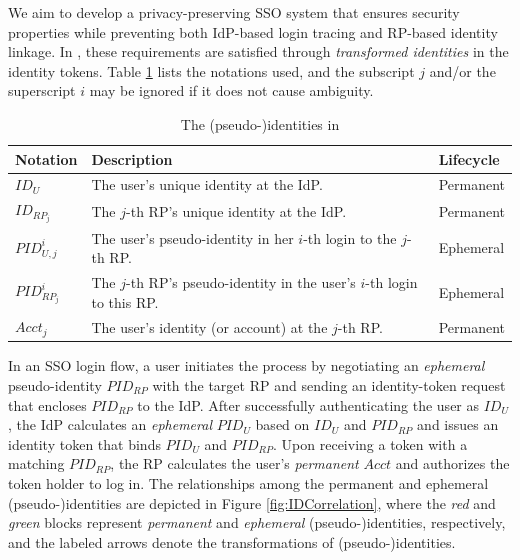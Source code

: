 We aim to develop a privacy-preserving SSO system that ensures security properties while preventing both IdP-based login tracing and RP-based identity linkage.
In \usso, these requirements are satisfied through \emph{transformed identities} in the identity tokens. Table \ref{tbl:notations-dilemma} lists the notations used,
and the subscript $j$ and/or the superscript $i$ may be ignored if it does not cause ambiguity.

\begin{table}[b]
\footnotesize
    \caption{The (pseudo-)identities in \usso}
    \centering
    \begin{tabular}{|p{0.93cm}|p{5.16cm}|p{1.13cm}|} \hline
    {\textbf{Notation}} & {\textbf{Description}} & {\textbf{Lifecycle}} \\ \hline
    {$ID_U$} & {The user's unique identity at the IdP.} & {Permanent} \\ \hline
    {$ID_{RP_j}$} & {The $j$-th RP's unique identity at the IdP.} & {Permanent} \\ \hline
    {$PID_{U,j}^i$} & {The user's pseudo-identity in her $i$-th login to the $j$-th RP.} & {Ephemeral} \\ \hline
    {$PID_{RP_j}^i$} & {The $j$-th RP's pseudo-identity in the user's $i$-th login to this RP.} & {Ephemeral} \\ \hline
    {$Acct_j$} & {The user's identity (or account) at the $j$-th RP.} & {Permanent} \\ \hline
    \end{tabular}
    \label{tbl:notations-dilemma}
\end{table}

In an SSO login flow, a user initiates the process by negotiating an \emph{ephemeral} pseudo-identity $PID_{RP}$  with the target RP and sending an identity-token request that encloses $PID_{RP}$ to the IdP.
After successfully authenticating the user as $ID_U$, the IdP calculates an \emph{ephemeral} $PID_U$ based on $ID_U$ and $PID_{RP}$ and issues an identity token that binds $PID_U$ and $PID_{RP}$. Upon receiving a token with a matching $PID_{RP}$, the RP calculates the user's \emph{permanent} $Acct$ and authorizes the token holder to log in.
The relationships among the permanent and ephemeral (pseudo-)identities are depicted in Figure \ref{fig:IDCorrelation}, where the \emph{red} and \emph{green} blocks represent \emph{permanent} and \emph{ephemeral} (pseudo-)identities, respectively, and the labeled arrows denote the transformations of (pseudo-)identities.

